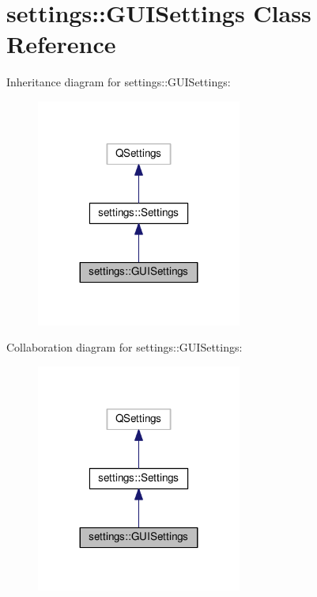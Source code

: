 \hypertarget{classsettings_1_1GUISettings}{}\section{settings\+:\+:G\+U\+I\+Settings Class Reference}
\label{classsettings_1_1GUISettings}


Inheritance diagram for settings\+:\+:G\+U\+I\+Settings\+:\nopagebreak
\begin{figure}[H]
\begin{center}
\leavevmode
\includegraphics[width=191pt]{classsettings_1_1GUISettings__inherit__graph}
\end{center}
\end{figure}


Collaboration diagram for settings\+:\+:G\+U\+I\+Settings\+:\nopagebreak
\begin{figure}[H]
\begin{center}
\leavevmode
\includegraphics[width=191pt]{classsettings_1_1GUISettings__coll__graph}
\end{center}
\end{figure}

